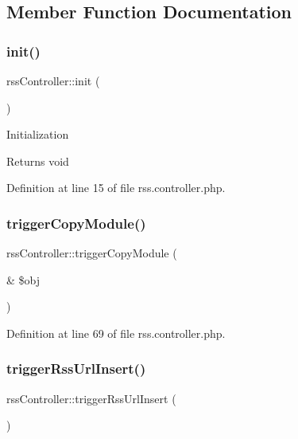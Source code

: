 \subsection{Member Function Documentation}
\mbox{\label{classrssController_ab492c2ecc29016a37dcb049f318a176b}} 
\subsubsection{\texorpdfstring{init()}{init()}}
{\footnotesize\ttfamily rss\+Controller\+::init (\begin{DoxyParamCaption}{ }\end{DoxyParamCaption})}

Initialization

\begin{DoxyReturn}{Returns}
void 
\end{DoxyReturn}


Definition at line 15 of file rss.\+controller.\+php.

\mbox{\label{classrssController_a4c6d4fe22c2f2abeabe6a1231a63fa8b}} 
\subsubsection{\texorpdfstring{trigger\+Copy\+Module()}{triggerCopyModule()}}
{\footnotesize\ttfamily rss\+Controller\+::trigger\+Copy\+Module (\begin{DoxyParamCaption}\item[{\&}]{\$obj }\end{DoxyParamCaption})}



Definition at line 69 of file rss.\+controller.\+php.

\mbox{\label{classrssController_a95c7672a5f1e362b368bec030577f33e}} 
\subsubsection{\texorpdfstring{trigger\+Rss\+Url\+Insert()}{triggerRssUrlInsert()}}
{\footnotesize\ttfamily rss\+Controller\+::trigger\+Rss\+Url\+Insert (\begin{DoxyParamCaption}{ }\end{DoxyParamCaption})}


